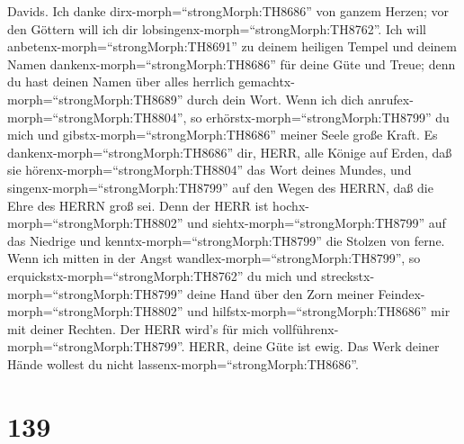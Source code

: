  Davids. Ich danke dirx-morph=``strongMorph:TH8686'' von
ganzem Herzen; vor den Göttern will ich dir
lobsingenx-morph=``strongMorph:TH8762''.  Ich will
anbetenx-morph=``strongMorph:TH8691'' zu deinem heiligen Tempel und
deinem Namen dankenx-morph=``strongMorph:TH8686'' für deine Güte und
Treue; denn du hast deinen Namen über alles herrlich
gemachtx-morph=``strongMorph:TH8689'' durch dein Wort.  Wenn
ich dich anrufex-morph=``strongMorph:TH8804'', so
erhörstx-morph=``strongMorph:TH8799'' du mich und
gibstx-morph=``strongMorph:TH8686'' meiner Seele große Kraft.
 Es dankenx-morph=``strongMorph:TH8686'' dir, HERR, alle
Könige auf Erden, daß sie hörenx-morph=``strongMorph:TH8804'' das Wort
deines Mundes,  und singenx-morph=``strongMorph:TH8799'' auf
den Wegen des HERRN, daß die Ehre des HERRN groß sei.  Denn
der HERR ist hochx-morph=``strongMorph:TH8802'' und
siehtx-morph=``strongMorph:TH8799'' auf das Niedrige und
kenntx-morph=``strongMorph:TH8799'' die Stolzen von ferne. 
Wenn ich mitten in der Angst wandlex-morph=``strongMorph:TH8799'', so
erquickstx-morph=``strongMorph:TH8762'' du mich und
streckstx-morph=``strongMorph:TH8799'' deine Hand über den Zorn meiner
Feindex-morph=``strongMorph:TH8802'' und
hilfstx-morph=``strongMorph:TH8686'' mir mit deiner Rechten.
 Der HERR wird's für mich
vollführenx-morph=``strongMorph:TH8799''. HERR, deine Güte ist ewig. Das
Werk deiner Hände wollest du nicht lassenx-morph=``strongMorph:TH8686''.

\hypertarget{section-138}{%
\section{139}\label{section-138}}

